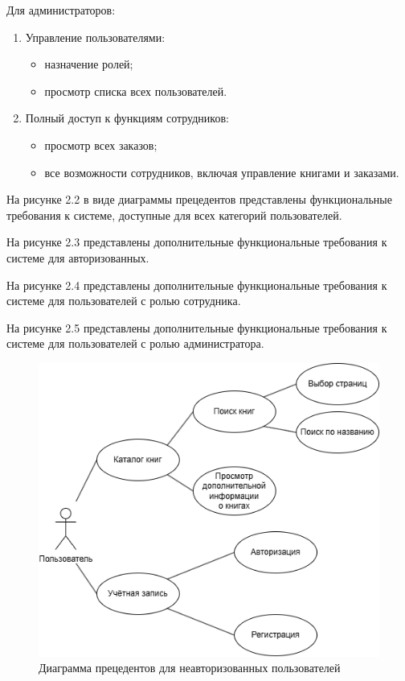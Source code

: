 Для администраторов:
\begin{enumerate}
	\item Управление пользователями:
	\begin{itemize}
		\item назначение ролей;
		\item просмотр списка всех пользователей.
	\end{itemize}
	\item Полный доступ к функциям сотрудников:
	\begin{itemize}
		\item просмотр всех заказов;
		\item все возможности сотрудников, включая управление книгами и заказами.
	\end{itemize}
\end{enumerate}

На рисунке 2.2 в виде диаграммы прецедентов представлены функциональные требования к системе, доступные для всех категорий пользователей.

На рисунке 2.3 представлены дополнительные функциональные требования к системе для авторизованных.

На рисунке 2.4 представлены дополнительные функциональные требования к системе для пользователей с ролью сотрудника.

На рисунке 2.5 представлены дополнительные функциональные требования к системе для пользователей с ролью администратора.

\begin{figure}[H]
	\centering
	\includegraphics[width=0.7\linewidth]{"images/Все_пользователи"}
	\caption{Диаграмма прецедентов для неавторизованных пользователей}
	\label{fig:--}
\end{figure}

